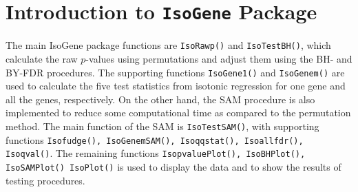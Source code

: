\documentclass[10pt]{article}
\begin{document}
\section{Introduction to \texttt{IsoGene} Package}
\label{sec: intro}







The main IsoGene package functions are \texttt{IsoRawp()} and
\texttt{IsoTestBH()}, which calculate the raw $p$-values using
permutations and adjust them using the BH- and BY-FDR procedures.
The supporting functions \texttt{IsoGene1()} and \texttt{IsoGenem()}
are used to calculate the five test statistics from isotonic
regression for one gene and all the genes, respectively. On the other hand,
the SAM procedure is also implemented to reduce some computational time as
compared to the permutation method. The main function of the SAM is \texttt{IsoTestSAM()},
with supporting functions \texttt{Isofudge(), IsoGenemSAM(), Isoqqstat(), Isoallfdr(), Isoqval()}.
The remaining functions \texttt{IsopvaluePlot(), IsoBHPlot(), IsoSAMPlot()
IsoPlot()} is used to display the data and
to show the results of testing procedures.
\end{document}
